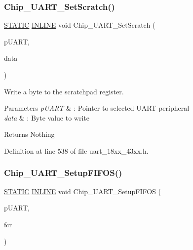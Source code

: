 \subsubsection{\texorpdfstring{Chip\+\_\+\+U\+A\+R\+T\+\_\+\+Set\+Scratch()}{Chip\_UART\_SetScratch()}}
{\footnotesize\ttfamily \hyperlink{group___l_p_c___types___public___macros_ga10b2d890d871e1489bb02b7e70d9bdfb}{S\+T\+A\+T\+IC} \hyperlink{spifi__18xx__43xx_8h_a2eb6f9e0395b47b8d5e3eeae4fe0c116}{I\+N\+L\+I\+NE} void Chip\+\_\+\+U\+A\+R\+T\+\_\+\+Set\+Scratch (\begin{DoxyParamCaption}\item[{\hyperlink{struct_l_p_c___u_s_a_r_t___t}{L\+P\+C\+\_\+\+U\+S\+A\+R\+T\+\_\+T} $\ast$}]{p\+U\+A\+RT,  }\item[{uint8\+\_\+t}]{data }\end{DoxyParamCaption})}



Write a byte to the scratchpad register. 


\begin{DoxyParams}{Parameters}
{\em p\+U\+A\+RT} & \+: Pointer to selected U\+A\+RT peripheral \\
\hline
{\em data} & \+: Byte value to write \\
\hline
\end{DoxyParams}
\begin{DoxyReturn}{Returns}
Nothing 
\end{DoxyReturn}


Definition at line 538 of file uart\+\_\+18xx\+\_\+43xx.\+h.

\mbox{\label{group___u_a_r_t__18_x_x__43_x_x_gac1a9d00d4f324e319e1486138b097874}} 
\subsubsection{\texorpdfstring{Chip\+\_\+\+U\+A\+R\+T\+\_\+\+Setup\+F\+I\+F\+O\+S()}{Chip\_UART\_SetupFIFOS()}}
{\footnotesize\ttfamily \hyperlink{group___l_p_c___types___public___macros_ga10b2d890d871e1489bb02b7e70d9bdfb}{S\+T\+A\+T\+IC} \hyperlink{spifi__18xx__43xx_8h_a2eb6f9e0395b47b8d5e3eeae4fe0c116}{I\+N\+L\+I\+NE} void Chip\+\_\+\+U\+A\+R\+T\+\_\+\+Setup\+F\+I\+F\+OS (\begin{DoxyParamCaption}\item[{\hyperlink{struct_l_p_c___u_s_a_r_t___t}{L\+P\+C\+\_\+\+U\+S\+A\+R\+T\+\_\+T} $\ast$}]{p\+U\+A\+RT,  }\item[{uint32\+\_\+t}]{fcr }\end{DoxyParamCaption})}



